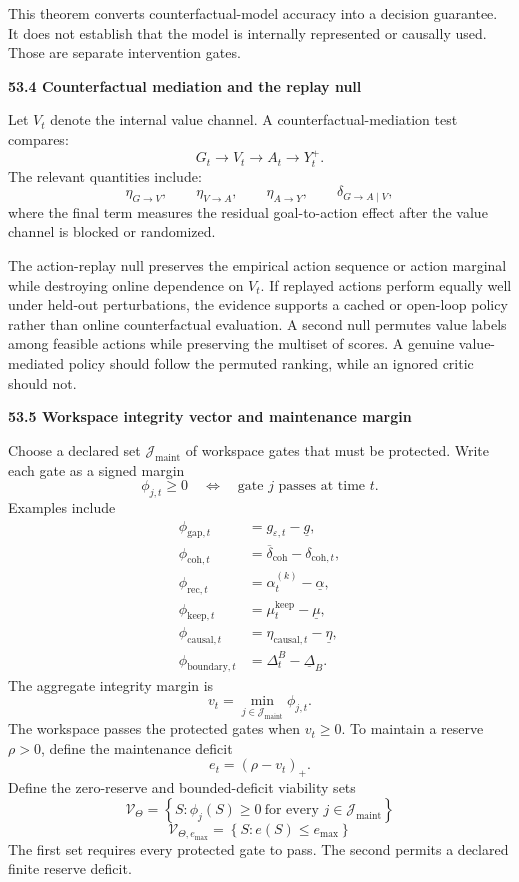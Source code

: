 \documentclass[11pt,letterpaper]{article}
\newcommand{\subtopic}[1]{%
 \vspace{0.45em}
 {\bfseries\color{AccentColor} #1\par}
}
\theoremstyle{plain}
\theoremstyle{definition}
\begin{document}
This theorem converts counterfactual-model accuracy into a decision guarantee.
It does not establish that the model is internally represented or causally
used. Those are separate intervention gates.

\subtopic{53.4 Counterfactual mediation and the replay null}

Let \(V_t\) denote the internal value channel. A counterfactual-mediation test
compares:
\[
G_t
\longrightarrow
V_t
\longrightarrow
A_t
\longrightarrow
Y_t^+.
\]
The relevant quantities include:
\[
\eta_{G\to V},
\qquad
\eta_{V\to A},
\qquad
\eta_{A\to Y},
\qquad
\delta_{G\to A\mid V},
\]
where the final term measures the residual goal-to-action effect after the
value channel is blocked or randomized.

The action-replay null preserves the empirical action sequence or action
marginal while destroying online dependence on \(V_t\). If replayed actions
perform equally well under held-out perturbations, the evidence supports a
cached or open-loop policy rather than online counterfactual evaluation. A
second null permutes value labels among feasible actions while preserving the
multiset of scores. A genuine value-mediated policy should follow the
permuted ranking, while an ignored critic should not.

\subtopic{53.5 Workspace integrity vector and maintenance margin}

Choose a declared set \(\mathcal J_{\mathrm{maint}}\) of workspace gates that
must be protected. Write each gate as a signed margin
\[
\phi_{j,t}
\geq0
\quad\Longleftrightarrow\quad
\text{gate }j\text{ passes at time }t.
\]
Examples include
\[
\begin{aligned}
\phi_{\mathrm{gap},t}
&=g_{\varepsilon,t}-\underline g,\\
\phi_{\mathrm{coh},t}
&=\overline\delta_{\mathrm{coh}}-\delta_{\mathrm{coh},t},\\
\phi_{\mathrm{rec},t}
&=\alpha_t^{(k)}-\underline\alpha,\\
\phi_{\mathrm{keep},t}
&=\mu_t^{\mathrm{keep}}-\underline\mu,\\
\phi_{\mathrm{causal},t}
&=\eta_{\mathrm{causal},t}-\underline\eta,\\
\phi_{\mathrm{boundary},t}
&=\Delta_t^B-\underline\Delta_B.
\end{aligned}
\]
The aggregate integrity margin is
\[
\boxed{
v_t
=
\min_{j\in\mathcal J_{\mathrm{maint}}}\phi_{j,t}.
}
\]
The workspace passes the protected gates when \(v_t\geq0\). To maintain a
reserve \(\rho>0\), define the maintenance deficit
\[
\boxed{
e_t
=(\rho-v_t)_+.
}
\]
Define the zero-reserve and bounded-deficit viability sets
\[
\boxed{
\mathcal V_\Theta
=
\left\{
S:\phi_j(S)\geq0\ \text{for every }j\in\mathcal J_{\mathrm{maint}}
\right\}
}
\]
\[
\boxed{
\mathcal V_{\Theta,e_{\max}}
=
\left\{
S:e(S)\leq e_{\max}
\right\}
}
\]
The first set requires every protected gate to pass. The second permits a
declared finite reserve deficit.
\end{document}
